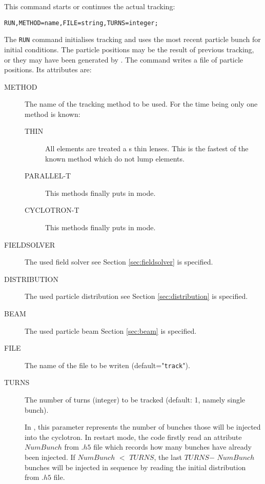 This command starts or continues the actual tracking:
\begin{verbatim}
RUN,METHOD=name,FILE=string,TURNS=integer;
\end{verbatim}
The \texttt{RUN} command initialises tracking and uses the most recent 
particle bunch for initial conditions.
The particle positions may be the result of previous tracking,
or they may have been generated by 
.
The command writes a file of particle positions.
Its attributes are:
\begin{description}
\item[METHOD]
  The name of the tracking method to be used.
  For the time being only one method is known:
  \begin{description}
  \item[THIN]
    All elements are treated a s thin lenses.
    This is the fastest of the known method which do not lump elements.
    \item[PARALLEL-T]
    This methods finally puts \opal in \opalt mode.
     \item[CYCLOTRON-T]
    This methods finally puts \opal in \opalcycl mode.
     \end{description}  
    \item[FIELDSOLVER]
     The used field solver see Section \ref{sec:fieldsolver} is specified.	
    
     \item[DISTRIBUTION]
     The used particle distribution see Section \ref{sec:distribution} is specified.	
 
   \item[BEAM]
     The used particle beam Section \ref{sec:beam} is specified.	


\item[FILE]
  The name of the file to be writen (default="\texttt{track}").
\item[TURNS]
  The number of turns (integer) to be tracked (default: 1, namely single bunch).

  In \opalcycl, this parameter represents the number of bunches those will be injected into the cyclotron. In restart mode, the code
  firstly read an attribute $NumBunch$ from $.h5$ file which records how many bunches have already been injected. If $NumBunch$
  $<$ $TURNS$, the last $TURNS$$ -$ $NumBunch$ bunches will be injected in sequence by reading the initial distribution from $.h5$ file.   


\end{description}
